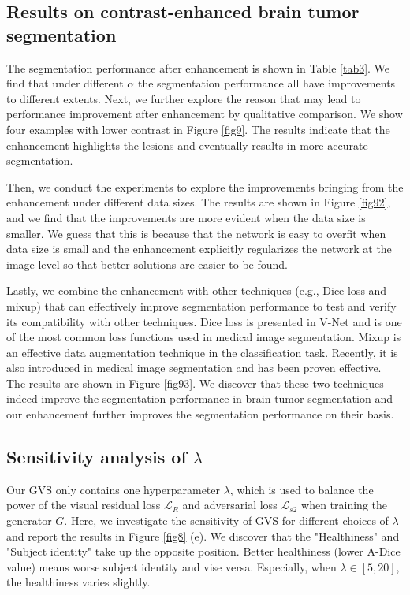 \documentclass[journal,twoside,web]{ieeecolor}
\begin{document}
\subsection{Results on contrast-enhanced brain tumor segmentation} \label{sec57}
The segmentation performance after enhancement is shown in Table \ref{tab3}. We find that under different $\alpha$ the segmentation performance all have improvements to different extents. Next, we further explore the reason that may lead to performance improvement after enhancement by qualitative comparison. We show four examples with lower contrast in Figure \ref{fig9}. The results indicate that the enhancement highlights the lesions and eventually results in more accurate segmentation.

Then, we conduct the experiments to explore the improvements bringing from the enhancement under different data sizes. The results are shown in Figure \ref{fig92}, and we find that the improvements are more evident when the data size is smaller. We guess that this is because that the network is easy to overfit when data size is small and the enhancement explicitly regularizes the network at the image level so that better solutions are easier to be found.

Lastly, we combine the enhancement with other techniques (e.g., Dice loss and mixup) that can effectively improve segmentation performance to test and verify its compatibility with other techniques. Dice loss is presented in V-Net \cite{Milletari2016VNetFC} and is one of the most common loss functions used in medical image segmentation. Mixup \cite{zhang2017mixup} is an effective data augmentation technique in the classification task. Recently, it is also introduced in medical image segmentation \cite{eaton2018improving} and has been proven effective. The results are shown in Figure \ref{fig93}. We discover that these two techniques indeed improve the segmentation performance in brain tumor segmentation and our enhancement further improves the segmentation performance on their basis.


\subsection{Sensitivity analysis of $\lambda$} \label{sec58}
Our GVS only contains one hyperparameter $\lambda$, which is used to balance the power of the visual residual loss  $\mathcal{L}_R$ and adversarial loss $\mathcal{L}_{s2}$ when training the generator $G$. Here, we investigate the sensitivity of GVS for different choices of $\lambda$ and report the results in Figure \ref{fig8} (e). We discover that the "Healthiness" and "Subject identity" take up the opposite position. Better healthiness (lower A-Dice value) means worse subject identity and vise versa. Especially, when $\lambda \in [5, 20]$, the healthiness varies slightly. 
\end{document}
